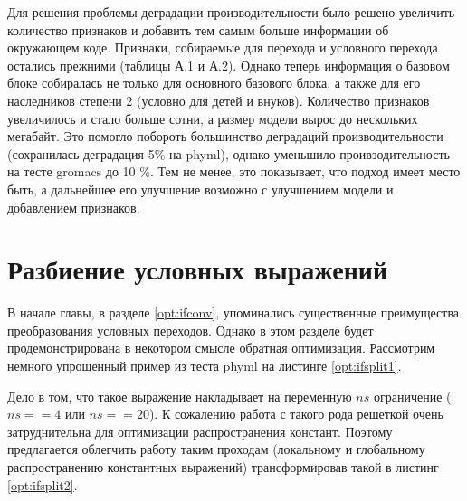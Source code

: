 Для решения проблемы деградации производительности было решено увеличить количество признаков и добавить тем самым больше информации об окружающем коде. Признаки, собираемые для перехода и условного перехода остались прежними (таблицы А.1 и А.2). Однако теперь информация о базовом блоке собиралась не только для основного базового блока, а также для его наследников степени 2 (условно для детей и внуков). Количество признаков увеличилось и стало больше сотни, а размер модели вырос до нескольких мегабайт. Это помогло побороть большинство деградаций производительности (сохранилась деградация 5\% на phyml), однако уменьшило проивзодительность на тесте gromacs до 10 \%. Тем не менее, это показывает, что подход имеет место быть, а дальнейшее его улучшение возможно с улучшением модели и добавлением признаков.

\section{Разбиение условных выражений}  \label{ifsplit}
В начале главы, в разделе \ref{opt:ifconv}, упоминались существенные преимущества преобразования условных переходов. Однако в этом разделе будет продемонстрирована в некотором смысле обратная оптимизация. Рассмотрим немного упрощенный пример из теста phyml на листинге \ref{opt:ifsplit1}.

Дело в том, что такое выражение накладывает на переменную $ns$ ограничение ($ns==4$ или $ns==20$). К сожалению работа с такого рода решеткой очень затруднительна для оптимизации распространения констант. Поэтому предлагается облегчить работу таким проходам (локальному и глобальному  распространению константных выражений) трансформировав такой в листинг \ref{opt:ifsplit2}.

